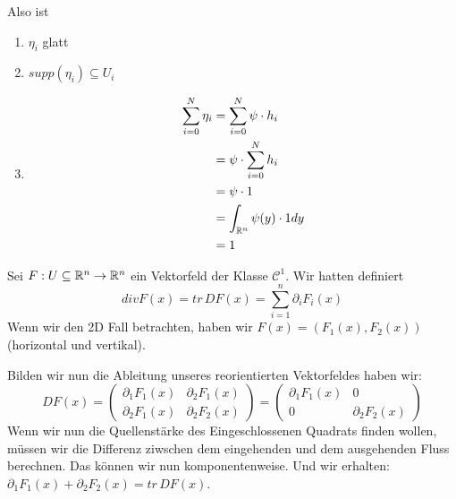 \documentclass[main.tex]{subfiles}
\begin{document}
\begin{Beweis}
  Also ist
  \begin{enumerate}
    \item $\eta_i$ glatt
    \item $supp(\eta_i) \subseteq U_i$
    \item $$\begin{aligned}
      \sum \limits_{i=0}^N \eta_i & = \sum \limits_{i=0}^N \psi \cdot h_i \\
      & = \psi \cdot \sum \limits_{i=0}^N h_i \\
      & = \psi \cdot 1 \\
      & = \int_{\mathbb{R}^n} \psi(y) \cdot 1 dy \\
      & = 1
    \end{aligned}$$
  \end{enumerate}
\end{Beweis}

\begin{Bemerkung}
  Sei $F: U \subseteq \mathbb{R}^n \to \mathbb{R}^n$ ein Vektorfeld der Klasse $\mathcal{C}^1$. Wir hatten definiert
  $$div F(x) = tr \, DF(x) = \sum \limits_{i=1}^n \partial_i F_i(x)$$
  Wenn wir den 2D Fall betrachten, haben wir $F(x) = (F_1(x),F_2(x))$ (horizontal und vertikal).

  Bilden wir nun die Ableitung unseres reorientierten Vektorfeldes haben wir:
  $$DF(x) = \begin{pmatrix}
    \partial_1 F_1(x) & \partial_2 F_1(x) \\ \partial_2 F_1(x) & \partial_2 F_2(x)
  \end{pmatrix} = \begin{pmatrix}
    \partial_1 F_1(x) & 0 \\ 0 & \partial_2 F_2(x)
  \end{pmatrix}$$
  Wenn wir nun die Quellenstärke des Eingeschlossenen Quadrats finden wollen, müssen wir die Differenz ziwschen dem eingehenden und dem ausgehenden Fluss berechnen. Das können wir nun komponentenweise. Und wir erhalten: $\partial_1 F_1(x) + \partial_2 F_2(x) = tr \, DF(x)$.
\end{Bemerkung}
\end{document}

